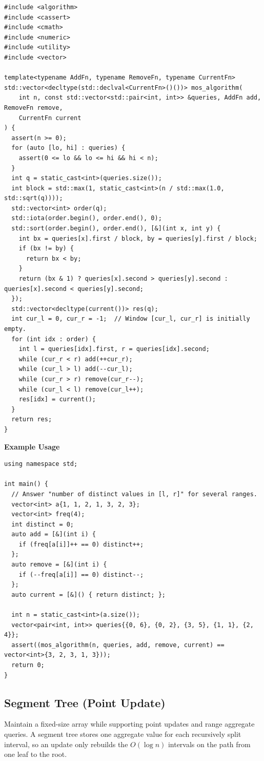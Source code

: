 \begin{lstlisting}[style=cpp]
#include <algorithm>
#include <cassert>
#include <cmath>
#include <numeric>
#include <utility>
#include <vector>

template<typename AddFn, typename RemoveFn, typename CurrentFn>
std::vector<decltype(std::declval<CurrentFn>()())> mos_algorithm(
    int n, const std::vector<std::pair<int, int>> &queries, AddFn add, RemoveFn remove,
    CurrentFn current
) {
  assert(n >= 0);
  for (auto [lo, hi] : queries) {
    assert(0 <= lo && lo <= hi && hi < n);
  }
  int q = static_cast<int>(queries.size());
  int block = std::max(1, static_cast<int>(n / std::max(1.0, std::sqrt(q))));
  std::vector<int> order(q);
  std::iota(order.begin(), order.end(), 0);
  std::sort(order.begin(), order.end(), [&](int x, int y) {
    int bx = queries[x].first / block, by = queries[y].first / block;
    if (bx != by) {
      return bx < by;
    }
    return (bx & 1) ? queries[x].second > queries[y].second : queries[x].second < queries[y].second;
  });
  std::vector<decltype(current())> res(q);
  int cur_l = 0, cur_r = -1;  // Window [cur_l, cur_r] is initially empty.
  for (int idx : order) {
    int l = queries[idx].first, r = queries[idx].second;
    while (cur_r < r) add(++cur_r);
    while (cur_l > l) add(--cur_l);
    while (cur_r > r) remove(cur_r--);
    while (cur_l < l) remove(cur_l++);
    res[idx] = current();
  }
  return res;
}
\end{lstlisting}
\textbf{Example Usage}\par
\begin{lstlisting}[style=cpp]
using namespace std;

int main() {
  // Answer "number of distinct values in [l, r]" for several ranges.
  vector<int> a{1, 1, 2, 1, 3, 2, 3};
  vector<int> freq(4);
  int distinct = 0;
  auto add = [&](int i) {
    if (freq[a[i]]++ == 0) distinct++;
  };
  auto remove = [&](int i) {
    if (--freq[a[i]] == 0) distinct--;
  };
  auto current = [&]() { return distinct; };

  int n = static_cast<int>(a.size());
  vector<pair<int, int>> queries{{0, 6}, {0, 2}, {3, 5}, {1, 1}, {2, 4}};
  assert((mos_algorithm(n, queries, add, remove, current) == vector<int>{3, 2, 3, 1, 3}));
  return 0;
}
\end{lstlisting}
\subsection{Segment Tree (Point Update)}
\label{sec:2.5.5}
Maintain a fixed-size array while supporting point updates and range aggregate queries. A segment tree stores one aggregate value for each recursively split interval, so an update only rebuilds the $O(\log n)$ intervals on the path from one leaf to the root.


